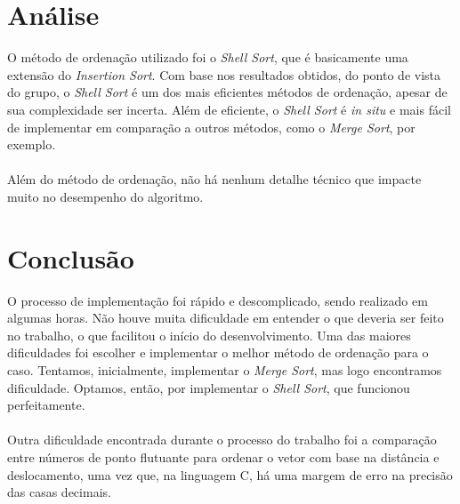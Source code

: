 \documentclass{article}
\begin{document}
\clearpage


\section{Análise}

\hspace*{\parindent}O método de ordenação utilizado foi o \textit{Shell Sort}, que é basicamente uma extensão do \textit{Insertion Sort}. Com base nos resultados obtidos, do ponto de vista do grupo, o \textit{Shell Sort} é um dos mais eficientes métodos de ordenação, apesar de sua complexidade ser incerta. Além de eficiente, o \textit{Shell Sort} é \textit{in situ} e mais fácil de implementar em comparação a outros métodos, como o \textit{Merge Sort}, por exemplo.\\\\
\hspace*{\parindent}Além do método de ordenação, não há nenhum detalhe técnico que impacte muito no desempenho do algoritmo.
\clearpage


\section{Conclusão}

\hspace*{\parindent}O processo de implementação foi rápido e descomplicado, sendo realizado em algumas horas. Não houve muita dificuldade em entender o que deveria ser feito no trabalho, o que facilitou o início do desenvolvimento. Uma das maiores dificuldades foi escolher e implementar o melhor método de ordenação para o caso. Tentamos, inicialmente, implementar o \textit{Merge Sort}, mas logo encontramos dificuldade. Optamos, então, por implementar o \textit{Shell Sort}, que funcionou perfeitamente.\\\\
\hspace*{\parindent}Outra dificuldade encontrada durante o processo do trabalho foi a comparação entre números de ponto flutuante para ordenar o vetor com base na distância e deslocamento, uma vez que, na linguagem C, há uma margem de erro na precisão das casas decimais.
\end{document}
